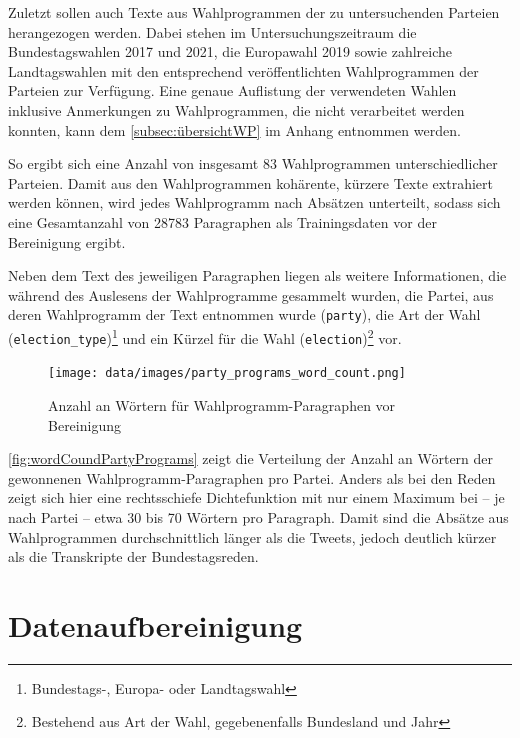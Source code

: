 Zuletzt sollen auch Texte aus Wahlprogrammen der zu untersuchenden Parteien herangezogen werden. Dabei stehen im Untersuchungszeitraum die Bundestagswahlen \num{2017} und \num{2021}, die Europawahl 2019 sowie zahlreiche Landtagswahlen mit den entsprechend veröffentlichten Wahlprogrammen der Parteien zur Verfügung. Eine genaue Auflistung der verwendeten Wahlen inklusive Anmerkungen zu Wahlprogrammen, die nicht verarbeitet werden konnten, kann dem \autoref{subsec:übersichtWP} im Anhang entnommen werden.

So ergibt sich eine Anzahl von insgesamt \num{83} Wahlprogrammen unterschiedlicher Parteien. Damit aus den Wahlprogrammen kohärente, kürzere Texte extrahiert werden können, wird jedes Wahlprogramm nach Absätzen unterteilt, sodass sich eine Gesamtanzahl von \num{28783} Paragraphen als Trainingsdaten vor der Bereinigung ergibt.


Neben dem Text des jeweiligen Paragraphen liegen als weitere Informationen, die während des Auslesens der Wahlprogramme gesammelt wurden, die Partei, aus deren Wahlprogramm der Text entnommen wurde (\texttt{party}), die Art der Wahl (\texttt{election\_type})\footnote{Bundestags-, Europa- oder Landtagswahl} und ein Kürzel für die Wahl (\texttt{election})\footnote{Bestehend aus Art der Wahl, gegebenenfalls Bundesland und Jahr} vor.

\begin{figure}[H]
    \centering
    \texttt{[image: data/images/party\_programs\_word\_count.png]}
    \caption{Anzahl an Wörtern für Wahlprogramm-Paragraphen vor Bereinigung} \label{fig:wordCoundPartyPrograms}
\end{figure}

\autoref{fig:wordCoundPartyPrograms} zeigt die Verteilung der Anzahl an Wörtern der gewonnenen Wahlprogramm-Paragraphen pro Partei. Anders als bei den Reden zeigt sich hier eine rechtsschiefe Dichtefunktion mit nur einem Maximum bei -- je nach Partei -- etwa \num{30} bis \num{70} Wörtern pro Paragraph. Damit sind die Absätze aus Wahlprogrammen durchschnittlich länger als die Tweets, jedoch deutlich kürzer als die Transkripte der Bundestagsreden. 


\section{Datenaufbereinigung} \label{sec:dataPreparation}


